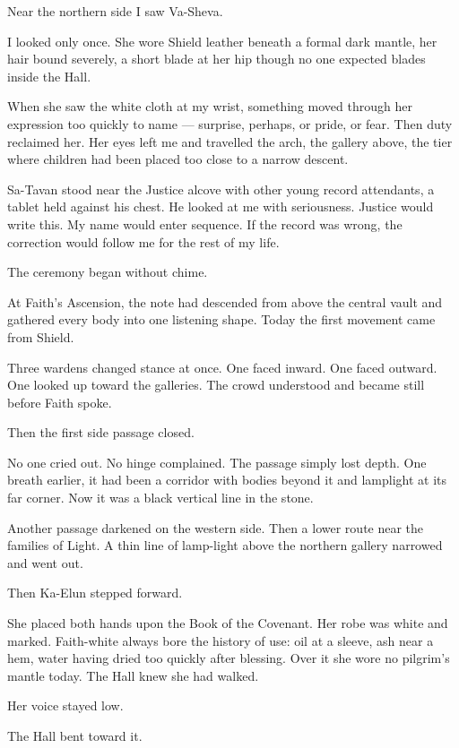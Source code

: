 Near the northern side I saw Va-Sheva.\par
I looked only once. She wore Shield leather beneath a formal dark mantle, her hair bound severely, a short blade at her hip though no one expected blades inside the Hall.\par
When she saw the white cloth at my wrist, something moved through her expression too quickly to name --- surprise, perhaps, or pride, or fear.
Then duty reclaimed her.
Her eyes left me and travelled the arch, the gallery above, the tier where children had been placed too close to a narrow descent.\par
Sa-Tavan stood near the Justice alcove with other young record attendants, a tablet held against his chest.
He looked at me with seriousness.
Justice would write this.
My name would enter sequence.
If the record was wrong, the correction would follow me for the rest of my life.\par
The ceremony began without chime.\par
At Faith's Ascension, the note had descended from above the central vault and gathered every body into one listening shape.
Today the first movement came from Shield.\par
Three wardens changed stance at once.
One faced inward.
One faced outward.
One looked up toward the galleries.
The crowd understood and became still before Faith spoke.\par
Then the first side passage closed.\par
No one cried out.
No hinge complained.
The passage simply lost depth.
One breath earlier, it had been a corridor with bodies beyond it and lamplight at its far corner.
Now it was a black vertical line in the stone.\par
Another passage darkened on the western side.
Then a lower route near the families of Light.
A thin line of lamp-light above the northern gallery narrowed and went out.\par
Then Ka-Elun stepped forward.\par
She placed both hands upon the Book of the Covenant.
Her robe was white and marked.
Faith-white always bore the history of use: oil at a sleeve, ash near a hem, water having dried too quickly after blessing.
Over it she wore no pilgrim's mantle today.
The Hall knew she had walked.\par
Her voice stayed low.\par
The Hall bent toward it.\par
